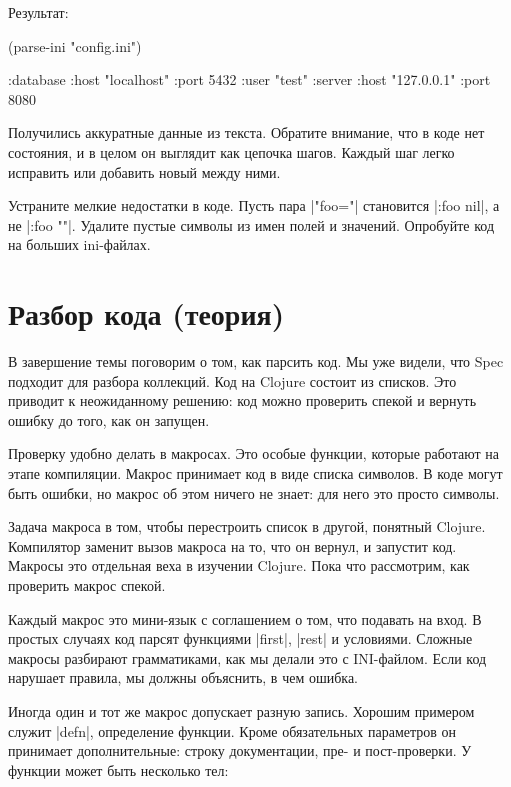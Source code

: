 \noindent
Результат:

\begin{english}
  \begin{clojure}
(parse-ini "config.ini")

{:database {:host "localhost"
            :port 5432
            :user "test"}
 :server {:host "127.0.0.1"
          :port 8080}}
  \end{clojure}
\end{english}

Получились аккуратные данные из текста. Обратите внимание, что в коде нет
состояния, и в целом он выглядит как цепочка шагов. Каждый шаг легко исправить
или добавить новый между ними.

Устраните мелкие недостатки в коде. Пусть пара \spverb|"foo="| становится
\spverb|{:foo nil}|, а не \spverb|{:foo ""}|.  Удалите пустые символы из имен
полей и значений. Опробуйте код на больших ini-файлах.

\section{Разбор кода (теория)}


В завершение темы поговорим о том, как парсить код. Мы уже видели, что Spec
подходит для разбора коллекций. Код на Clojure состоит из списков. Это приводит
к неожиданному решению: код можно проверить спекой и вернуть ошибку до того, как
он запущен.

Проверку удобно делать в макросах. Это особые функции, которые работают на этапе
компиляции. Макрос принимает код в виде списка символов. В коде могут быть
ошибки, но макрос об этом ничего не знает: для него это просто символы.

Задача макроса в том, чтобы перестроить список в другой, понятный
Clojure. Компилятор заменит вызов макроса на то, что он вернул, и запустит
код. Макросы это отдельная веха в изучении Clojure. Пока что рассмотрим, как
проверить макрос спекой.

Каждый макрос это мини-язык с соглашением о том, что подавать на вход. В простых
случаях код парсят функциями \spverb|first|, \spverb|rest| и условиями. Сложные
макросы разбирают грамматиками, как мы делали это с INI-файлом. Если код
нарушает правила, мы должны объяснить, в чем ошибка.


Иногда один и тот же макрос допускает разную запись. Хорошим примером служит
\spverb|defn|, определение функции. Кроме обязательных параметров он принимает
дополнительные: строку документации, пре- и пост-проверки. У функции может быть
несколько тел:


